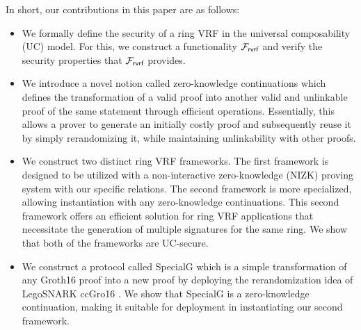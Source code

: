 In short, our contributions in this paper are as follows:
 \begin{itemize}
 	\item We formally define the security of a ring VRF in the universal composability (UC) model. For this, we construct a functionality $ \mathcal{F}_{\textsf{rvrf}} $ and verify the security properties that $ \mathcal{F}_{\textsf{rvrf}} $ provides.
 	
 	\item We introduce a novel notion called zero-knowledge continuations  which defines the transformation of a valid proof into another valid and unlinkable proof of the same statement through efficient operations. Essentially, this allows a prover to generate an initially costly proof and subsequently reuse it by simply rerandomizing it,  while maintaining unlinkability with other proofs. 
 	
 	\item We construct two distinct  ring VRF frameworks. The first framework is designed to be utilized with a non-interactive zero-knowledge (NIZK) proving system with our specific relations. The second framework is more specialized, allowing instantiation with any zero-knowledge continuations. This second framework offers an efficient solution for ring VRF applications that necessitate the generation of multiple signatures for the same ring. We show that both of the frameworks are UC-secure.
 	
 	\item 	We construct a protocol called SpecialG  which  is a simple transformation of any Groth16 proof into a new proof by deploying the rerandomization idea of LegoSNARK ccGro16 \cite{LegoSNARK}. We show that SpecialG is a zero-knowledge continuation, making it suitable for deployment in instantiating our second framework.
 	 
  
 \end{itemize}
